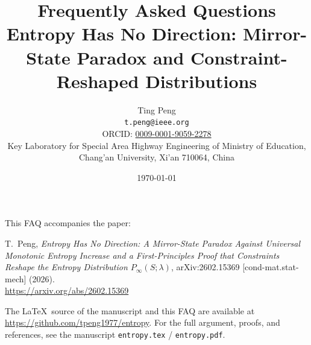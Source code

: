 \documentclass[11pt,a4paper]{article}
\title{Frequently Asked Questions\\
\large Entropy Has No Direction: Mirror-State Paradox and Constraint-Reshaped Distributions}
\author{Ting Peng\\
  \texttt{t.peng@ieee.org}\\
  ORCID: \href{https://orcid.org/0009-0001-9059-2278}{0009-0001-9059-2278}\\
  Key Laboratory for Special Area Highway Engineering of Ministry of Education,\\
  Chang'an University, Xi'an 710064, China}
\date{\today}
\begin{document}
\maketitle

\noindent
This FAQ accompanies the paper:

\medskip
\noindent
T.~Peng, \emph{Entropy Has No Direction: A Mirror-State Paradox Against Universal Monotonic Entropy Increase and a First-Principles Proof that Constraints Reshape the Entropy Distribution $P_{\infty}(S;\lambda)$}, arXiv:2602.15369 [cond-mat.stat-mech] (2026).\\
\url{https://arxiv.org/abs/2602.15369}

\medskip
\noindent
The \LaTeX\ source of the manuscript and this FAQ are available at \url{https://github.com/tpeng1977/entropy}. For the full argument, proofs, and references, see the manuscript \texttt{entropy.tex} / \texttt{entropy.pdf}.
\end{document}

